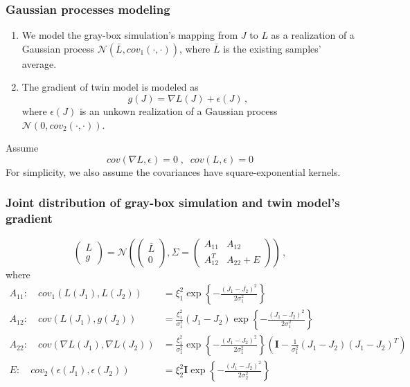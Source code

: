 \documentclass{beamer}
\begin{document}
\begin{frame}
    \frametitle{Gaussian processes modeling}
    \begin{enumerate}
        \item We model the gray-box simulation's mapping from $J$ to $L$ as a realization of a Gaussian process
        $\mathcal{N}(\bar{L}, cov_1(\cdot,\cdot))$, where $\bar{L}$ is the existing samples' average.\\
        \item The gradient of twin model is modeled as
        $$
            g(J) = \nabla L(J) + \epsilon(J)\,,
        $$
        where $\epsilon(J)$ is an unkown realization of a Gaussian process $\mathcal{N}(0, cov_2(\cdot,\cdot))$.\\
        \vspace{0.2cm}
    \end{enumerate}
    Assume
    $$
        cov(\nabla L, \epsilon) = 0\;,\;\; cov(L, \epsilon) = 0
    $$
    For simplicity, we also assume the covariances have square-exponential kernels.
\end{frame}

\begin{frame}
    \frametitle{Joint distribution of gray-box simulation and twin model's gradient}
    \begin{equation*}
    \begin{pmatrix}
        L\\ g
    \end{pmatrix}
    =
    \mathcal{N}\left(
    \begin{pmatrix}
        \bar{L}\\
        0
    \end{pmatrix} ,
    \Sigma = 
    \begin{pmatrix}
        A_{11} & A_{12}\\
        A_{12}^T & A_{22}+E
    \end{pmatrix}
    \right)\,,
\end{equation*}
where \scriptsize
\begin{equation*}\begin{split}
A_{11}: \quad cov_1(L(J_1), L(J_2)) &= \xi_1^2 \exp\left\{ -\frac{(J_1-J_2)^2}{2\sigma_1^2} \right\}\\
A_{12}: \quad cov(L(J_1), g(J_2)) &= \frac{\xi_1^2}{\sigma_1^2} (J_1-J_2) \exp\left\{
    -\frac{(J_1-J_2)^2}{2\sigma_1^2}
    \right\}\\
A_{22}: \quad cov(\nabla L(J_1), \nabla L(J_2)) &= \frac{\xi_1^2}{\sigma_1^2}\exp\left\{
    -\frac{(J_1-J_2)^2}{2\sigma_1^2} \right\} \left(  \boldsymbol{I} -\frac{1}{\sigma_1^2}(J_1-J_2)(J_1-J_2)^T\right)\\
E: \quad cov_2(\epsilon(J_1), \epsilon(J_2)) &= \xi_2^2 \boldsymbol{I}\exp\left\{-\frac{(J_1-J_2)^2}{2\sigma_2^2}\right\}
\end{split}\end{equation*}
\end{frame}
\end{document}
